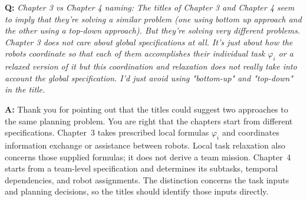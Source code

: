 \documentclass[11pt]{article}
\begin{document}
\begin{shaded*}
\noindent\textbf{Q:} \emph{Chapter 3 vs Chapter 4 naming: The titles of
Chapter 3 and Chapter 4 seem to imply that they're solving a similar problem (one using
bottom up approach and the other using a top-down approach). But they're solving very
different problems. Chapter 3 does not care about global specifications at all. It's just
about how the robots coordinate so that each of them accomplishes their individual task
$\varphi_i$ or a relaxed version of it but this coordination and relaxation does not
really take into account the global specification. I'd just avoid using "bottom-up" and
"top-down" in the title.}
\end{shaded*}
\noindent\textbf{A:} Thank you for pointing out that the titles could suggest
two approaches to the same planning problem. You are right that the chapters
start from different specifications. Chapter~3 takes prescribed local formulas
$\varphi_i$ and coordinates information exchange or assistance between robots.
Local task relaxation also concerns those supplied formulas; it does not derive
a team mission. Chapter~4 starts from a team-level specification and determines
its subtasks, temporal dependencies, and robot assignments. The distinction
concerns the task inputs and planning decisions, so the titles should identify
those inputs directly.
\end{document}
